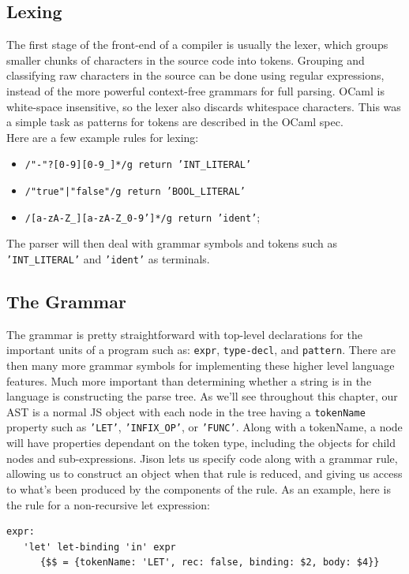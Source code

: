 \documentclass[12pt,a4paper,twoside,openright]{report}
\begin{document}
\subsection{Lexing}
The first stage of the front-end of a compiler is usually the lexer, which groups smaller chunks of characters in the source code into tokens.
Grouping and classifying raw characters in the source can be done using regular expressions, instead of the more powerful context-free grammars for full parsing.
OCaml is white-space insensitive, so the lexer also discards whitespace characters.
This was a simple task as patterns for tokens are described in the OCaml spec. \\
Here are a few example rules for lexing:
\begin{itemize}
   \item {\tt /"-"?[0-9][0-9\_]*/g return 'INT\_LITERAL'}
   \item {\tt /"true"|"false"/g return 'BOOL\_LITERAL'}
   \item {\tt /[a-zA-Z\_][a-zA-Z\_0-9']*/g return 'ident'};
\end{itemize}
The parser will then deal with grammar symbols and tokens such as {\tt 'INT\_LITERAL'} and {\tt 'ident'} as terminals.

\subsection{The Grammar}
The grammar is pretty straightforward with top-level declarations for the important units of a program such as: {\tt expr}, {\tt type-decl}, and {\tt pattern}.
There are then many more grammar symbols for implementing these higher level language features.
Much more important than determining whether a string is in the language is constructing the parse tree.
As we'll see throughout this chapter, our AST is a normal JS object with each node in the tree having a {\tt tokenName} property such as {\tt 'LET'}, {\tt 'INFIX\_OP'}, or {\tt 'FUNC'}.
Along with a tokenName, a node will have properties dependant on the token type, including the objects for child nodes and sub-expressions.
Jison lets us specify code along with a grammar rule, allowing us to construct an object when that rule is reduced, and giving us access to what's been produced by the components of the rule.
As an example, here is the rule for a non-recursive let expression:
\begin{verbatim}
expr:
   'let' let-binding 'in' expr
      {$$ = {tokenName: 'LET', rec: false, binding: $2, body: $4}} \end{verbatim}
\end{document}
